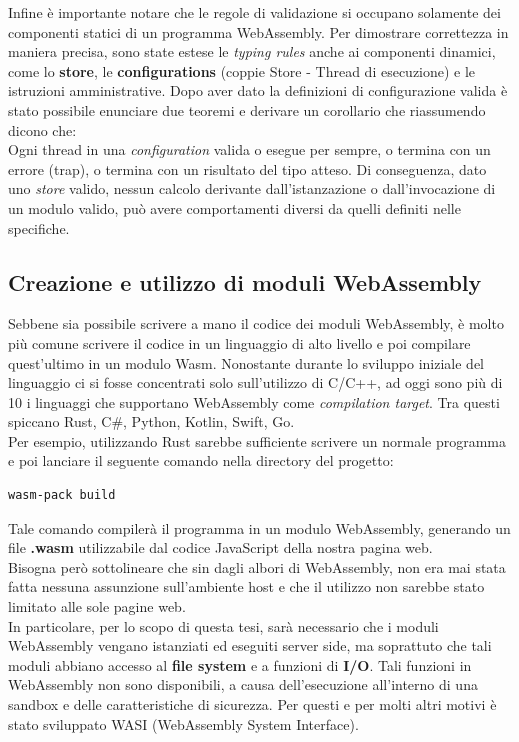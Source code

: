 Infine è importante notare che le regole di validazione si occupano solamente dei componenti statici di un programma WebAssembly. Per dimostrare correttezza in maniera precisa, sono state estese le \emph{typing rules} anche ai componenti dinamici, come lo \textbf{store}, le \textbf{configurations} (coppie Store - Thread di esecuzione) e le istruzioni amministrative.
Dopo aver dato la definizioni di configurazione valida è stato possibile enunciare due teoremi e derivare un corollario che riassumendo dicono che:
\\Ogni thread in una \emph{configuration} valida o esegue per sempre, o termina con un errore (trap), o termina con un risultato del tipo atteso. Di conseguenza, dato uno \emph{store} valido, nessun calcolo derivante dall'istanzazione o dall'invocazione di un modulo valido, può avere comportamenti diversi da quelli definiti nelle specifiche. \cite*{wasm:soundness:theorems}
\subsection{Creazione e utilizzo di moduli WebAssembly}
Sebbene sia possibile scrivere a mano il codice dei moduli WebAssembly, è molto più comune scrivere il codice in un linguaggio di alto livello e poi compilare quest'ultimo in un modulo Wasm.
Nonostante durante lo sviluppo iniziale del linguaggio ci si fosse concentrati solo sull'utilizzo di C/C++, ad oggi sono più di 10 i linguaggi che supportano WebAssembly come \emph{compilation target}. Tra questi spiccano Rust, C\#, Python, Kotlin, Swift, Go. 
\\Per esempio, utilizzando Rust sarebbe sufficiente scrivere un normale programma e poi lanciare il seguente comando nella directory del progetto: 
\begin{lstlisting}[language=Bash, numbers=none, label=lst:RustCompile, caption={}]
wasm-pack build
\end{lstlisting}
Tale comando compilerà il programma in un modulo WebAssembly, generando un file \textbf{.wasm} utilizzabile dal codice JavaScript della nostra pagina web.
\\Bisogna però sottolineare che sin dagli albori di WebAssembly, non era mai stata fatta nessuna assunzione sull'ambiente host e che il utilizzo non sarebbe stato limitato alle sole pagine web.
\\In particolare, per lo scopo di questa tesi, sarà necessario che i moduli WebAssembly vengano istanziati ed eseguiti server side, ma soprattuto che tali moduli abbiano accesso al \textbf{file system} e a funzioni di \textbf{I/O}.
Tali funzioni in WebAssembly non sono disponibili, a causa dell'esecuzione all'interno di una sandbox e delle caratteristiche di sicurezza. Per questi e per molti altri motivi è stato sviluppato WASI (WebAssembly System Interface).
\newpage
